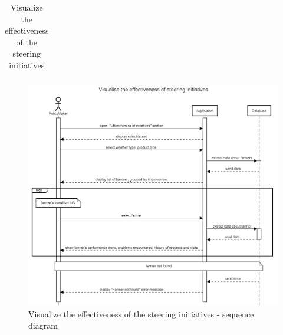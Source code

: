 \begin{table}[H]
\begin{tabular}{|l|p{}|}
    \end{tabular}
    \caption{\label{tab:visualize_iprovement}Visualize the effectiveness of the steering initiatives}
\end{table}

\begin{figure}[H]
    \centering
    \includegraphics[scale=0.5]{Images/Sequence diagrams/SE2 - visualise effectiveness of steering initiatives (pm).png}
    \caption{Visualize the effectiveness of the steering initiatives - sequence diagram}
    \label{fig:fig:seq_diag_visualize_improvement}
\end{figure}

